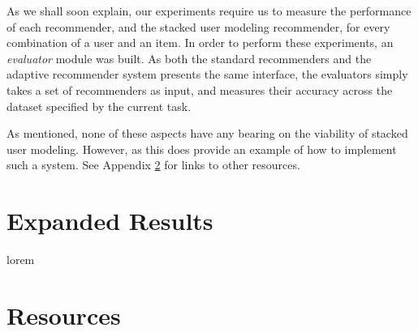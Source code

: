 As we shall soon explain, our experiments require us to measure the performance of each
recommender, and the stacked user modeling recommender, for every combination of 
a user and an item.
In order to perform these experiments, an \emph{evaluator} module was built.
As both the standard recommenders and the adaptive recommender system presents the same 
interface, the evaluators simply takes a set of recommenders as input, 
and measures their accuracy across the dataset specified by the current task.

As mentioned, none of these aspects have any bearing on the viability of stacked user modeling.
However, as this does provide an example of how to implement such a system. 
See Appendix \ref{appendix:resources} for links to other resources. 




\chapter{Expanded Results}

lorem


\chapter{Resources}
\label{appendix:resources}

